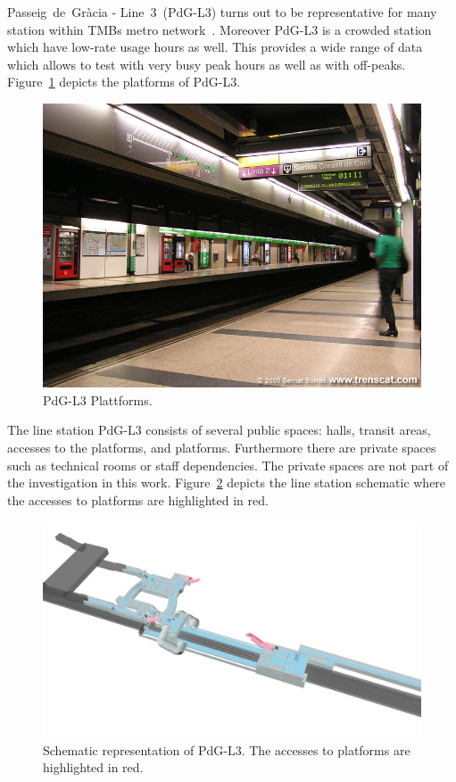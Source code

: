 Passeig~de~Gr\`{a}cia - Line~3~(PdG-L3) turns out to be representative for many station within TMBs metro network~\cite{TMB}. Moreover PdG-L3 is a crowded station which have low-rate usage hours as well. This provides a wide range of data which allows to test with very busy peak hours as well as with off-peaks. Figure~\ref{fig:PdG-L3_platforms} depicts the platforms of PdG-L3.

\begin{figure}[htb]
  \centering
  \includegraphics[width=\linewidth]{Figures/PdG-L3_platforms.jpg} 
  \caption{PdG-L3 Plattforms. \cite{TMB}}
  \label{fig:PdG-L3_platforms}
\end{figure}

The line station PdG-L3 consists of several public spaces: halls, transit areas, accesses to the platforms, and platforms. Furthermore there are private spaces such as technical rooms or staff dependencies. The private spaces are not part of the investigation in this work. Figure~\ref{fig:PdG-L3_schematic} depicts the line station schematic where the accesses to platforms are highlighted in red.

\begin{figure}[htb]
  \centering
  \includegraphics[width=\linewidth]{Figures/PdG-L3_schematic.jpg} 
  \caption{Schematic representation of PdG-L3. The accesses to platforms are highlighted in red. \cite{TMB}}
  \label{fig:PdG-L3_schematic}
\end{figure}

